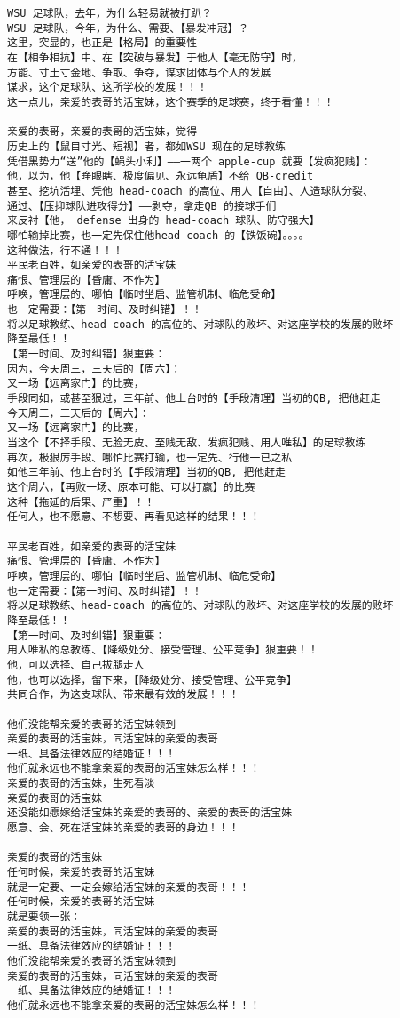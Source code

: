 \documentclass[9pt, b5paper]{article}
\begin{document}
\begin{verbatim}
WSU 足球队，去年，为什么轻易就被打趴？
WSU 足球队，今年，为什么、需要、【暴发冲冠】？
这里，突显的，也正是【格局】的重要性
在【相争相抗】中、在【突破与暴发】于他人【毫无防守】时，
方能、寸土寸金地、争取、争夺，谋求团体与个人的发展
谋求，这个足球队、这所学校的发展！！！
这一点儿，亲爱的表哥的活宝妹，这个赛季的足球赛，终于看懂！！！

亲爱的表哥，亲爱的表哥的活宝妹，觉得
历史上的【鼠目寸光、短视】者，都如WSU 现在的足球教练
凭借黑势力“送”他的【蝇头小利】——一两个 apple-cup 就要【发疯犯贱】：
他，以为，他【睁眼瞎、极度偏见、永远龟盾】不给 QB-credit
甚至、挖坑活埋、凭他 head-coach 的高位、用人【自由】、人造球队分裂、
通过、【压抑球队进攻得分】——剥夺，拿走QB 的接球手们
来反衬【他， defense 出身的 head-coach 球队、防守强大】
哪怕输掉比赛，也一定先保住他head-coach 的【铁饭碗】。。。。
这种做法，行不通！！！
平民老百姓，如亲爱的表哥的活宝妹
痛恨、管理层的【昏庸、不作为】
呼唤，管理层的、哪怕【临时坐启、监管机制、临危受命】
也一定需要：【第一时间、及时纠错】！！
将以足球教练、head-coach 的高位的、对球队的败坏、对这座学校的发展的败坏
降至最低！！
【第一时间、及时纠错】狠重要：
因为，今天周三，三天后的【周六】：
又一场【远离家门】的比赛，
手段同如，或甚至狠过，三年前、他上台时的【手段清理】当初的QB, 把他赶走
今天周三，三天后的【周六】：
又一场【远离家门】的比赛，
当这个【不择手段、无脸无皮、至贱无敌、发疯犯贱、用人唯私】的足球教练
再次，极狠厉手段、哪怕比赛打输，也一定先、行他一已之私
如他三年前、他上台时的【手段清理】当初的QB, 把他赶走
这个周六，【再败一场、原本可能、可以打赢】的比赛
这种【拖延的后果、严重】！！
任何人，也不愿意、不想要、再看见这样的结果！！！

平民老百姓，如亲爱的表哥的活宝妹
痛恨、管理层的【昏庸、不作为】
呼唤，管理层的、哪怕【临时坐启、监管机制、临危受命】
也一定需要：【第一时间、及时纠错】！！
将以足球教练、head-coach 的高位的、对球队的败坏、对这座学校的发展的败坏
降至最低！！
【第一时间、及时纠错】狠重要：
用人唯私的总教练、【降级处分、接受管理、公平竞争】狠重要！！
他，可以选择、自己拔腿走人
他，也可以选择，留下来，【降级处分、接受管理、公平竞争】
共同合作，为这支球队、带来最有效的发展！！！

他们没能帮亲爱的表哥的活宝妹领到
亲爱的表哥的活宝妹，同活宝妹的亲爱的表哥
一纸、具备法律效应的结婚证！！！
他们就永远也不能拿亲爱的表哥的活宝妹怎么样！！！
亲爱的表哥的活宝妹，生死看淡
亲爱的表哥的活宝妹
还没能如愿嫁给活宝妹的亲爱的表哥的、亲爱的表哥的活宝妹
愿意、会、死在活宝妹的亲爱的表哥的身边！！！

亲爱的表哥的活宝妹
任何时候，亲爱的表哥的活宝妹
就是一定要、一定会嫁给活宝妹的亲爱的表哥！！！
任何时候，亲爱的表哥的活宝妹
就是要领一张：
亲爱的表哥的活宝妹，同活宝妹的亲爱的表哥
一纸、具备法律效应的结婚证！！！
他们没能帮亲爱的表哥的活宝妹领到
亲爱的表哥的活宝妹，同活宝妹的亲爱的表哥
一纸、具备法律效应的结婚证！！！
他们就永远也不能拿亲爱的表哥的活宝妹怎么样！！！


\end{verbatim}
\end{document}
